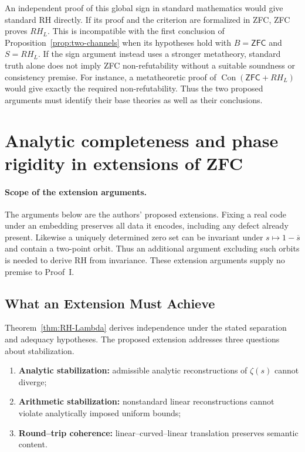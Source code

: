 \documentclass{article}
\theoremstyle{definition}
\begin{document}
An independent proof of this global sign in standard mathematics would
give standard RH directly. If its proof and the criterion are formalized
in ZFC, ZFC proves $RH_L$. This is incompatible with the first conclusion
of Proposition~\ref{prop:two-channels} when its hypotheses hold with
$B=\mathsf{ZFC}$ and $S=RH_L$. If the sign argument instead uses a
stronger metatheory, standard truth alone does not imply ZFC
non-refutability without a suitable soundness or consistency premise.
For instance, a metatheoretic proof of $\operatorname{Con}(\mathsf{ZFC}+RH_L)$
would give exactly the required non-refutability. Thus the two proposed
arguments must identify their base theories as well as their conclusions.

\section{Analytic completeness and phase rigidity in extensions of ZFC}

\paragraph{Scope of the extension arguments.}
The arguments below are the authors' proposed extensions. Fixing a real
code under an embedding preserves all data it encodes, including any defect
already present. Likewise a uniquely determined zero set can be invariant
under $s\mapsto1-\overline{s}$ and contain a two-point orbit. Thus an
additional argument excluding such orbits is needed to derive RH from
invariance. These extension arguments supply no premise to Proof~I.

\subsection{What an Extension Must Achieve}

Theorem~\ref{thm:RH-Lambda} derives independence under the stated
separation and adequacy hypotheses. The proposed extension addresses
three questions about stabilization.

\begin{enumerate}
\item \textbf{Analytic stabilization:} admissible analytic reconstructions of
$\zeta(s)$ cannot diverge;
\item \textbf{Arithmetic stabilization:} nonstandard linear reconstructions
cannot violate analytically imposed uniform bounds;
\item \textbf{Round--trip coherence:} linear--curved--linear translation preserves
semantic content.
\end{enumerate}
\end{document}
